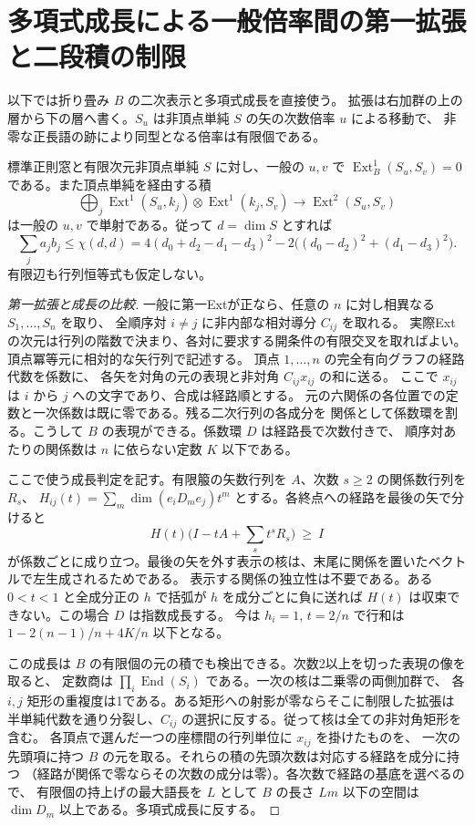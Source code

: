 \section{多項式成長による一般倍率間の第一拡張と二段積の制限}
\label{sec:polynomial-growth-extension-bridges}
以下では折り畳み $B$ の二次表示と多項式成長を直接使う。
拡張は右加群の上の層から下の層へ書く。$S_u$ は非頂点単純 $S$ の矢の次数倍率 $u$ による移動で、
非零な正長語の跡により同型となる倍率は有限個である。

\begin{theorem}\label{thm:growth-generic-extensions}
標準正則窓と有限次元非頂点単純 $S$ に対し、一般の $u,v$ で
$\operatorname{Ext}^1_B(S_u,S_v)=0$ である。また頂点単純を経由する積
\[
 \bigoplus_j\operatorname{Ext}^1(S_u,k_j)\otimes\operatorname{Ext}^1(k_j,S_v)
 \longrightarrow\operatorname{Ext}^2(S_u,S_v)
\]
は一般の $u,v$ で単射である。従って $d=\dim S$ とすれば
\[
 \sum_j a_j b_j\le\chi(d,d)
 =4(d_0+d_2-d_1-d_3)^2-2\big((d_0-d_2)^2+(d_1-d_3)^2\big).
\]
有限辺も行列恒等式も仮定しない。
\end{theorem}

\begin{proof}[第一拡張と成長の比較]
一般に第一Extが正なら、任意の $n$ に対し相異なる $S_1,\ldots,S_n$ を取り、
全順序対 $i\ne j$ に非内部な相対導分 $C_{ij}$ を取れる。
実際Extの次元は行列の階数で決まり、各対に要求する開条件の有限交叉を取ればよい。
頂点冪等元に相対的な矢行列で記述する。
頂点 $1,\ldots,n$ の完全有向グラフの経路代数を係数に、
各矢を対角の元の表現と非対角 $C_{ij}x_{ij}$ の和に送る。
ここで $x_{ij}$ は $i$ から $j$ への文字であり、合成は経路順とする。
元の六関係の各位置での定数と一次係数は既に零である。残る二次行列の各成分を
関係として係数環を割る。こうして $B$ の表現ができる。係数環 $D$ は経路長で次数付きで、
順序対あたりの関係数は $n$ に依らない定数 $K$ 以下である。

ここで使う成長判定を記す。有限箙の矢数行列を $A$、次数 $s\ge2$ の関係数行列を $R_s$、
$H_{ij}(t)=\sum_m\dim(e_iD_me_j)t^m$ とする。各終点への経路を最後の矢で分けると
\[
 H(t)\big(I-tA+\textstyle\sum_s t^s R_s\big)\ \ge\ I
\]
が係数ごとに成り立つ。最後の矢を外す表示の核は、末尾に関係を置いたベクトルで左生成されるためである。
表示する関係の独立性は不要である。ある $0<t<1$ と全成分正の $h$ で括弧が
$h$ を成分ごとに負に送れば $H(t)$ は収束できない。この場合 $D$ は指数成長する。
今は $h_i=1$, $t=2/n$ で行和は $1-2(n-1)/n+4K/n$ 以下となる。

この成長は $B$ の有限個の元の積でも検出できる。次数2以上を切った表現の像を取ると、
定数商は $\prod_i\operatorname{End}(S_i)$ である。一次の核は二乗零の両側加群で、
各 $i,j$ 矩形の重複度は1である。ある矩形への射影が零ならそこに制限した拡張は
半単純代数を通り分裂し、$C_{ij}$ の選択に反する。従って核は全ての非対角矩形を含む。
各頂点で選んだ一つの座標間の行列単位に $x_{ij}$ を掛けたものを、
一次の先頭項に持つ $B$ の元を取る。それらの積の先頭次数は対応する経路を成分に持つ
（経路が関係で零ならその次数の成分は零）。各次数で経路の基底を選べるので、
有限個の持上げの最大語長を $L$ として $B$ の長さ $Lm$ 以下の空間は
$\dim D_m$ 以上である。多項式成長に反する。
\end{proof}


